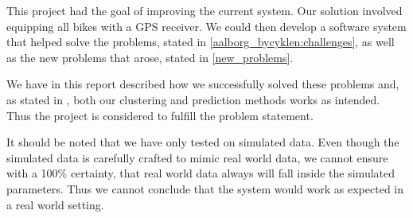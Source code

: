 This project had the goal of improving the current \citybike system.
Our solution involved equipping all bikes with a GPS receiver. We could then develop a software system that helped solve the problems, stated in \ref{aalborg_bycyklen:challenges}, as well as the new problems that arose, stated in \ref{new_problems}.

We have in this report described how we successfully solved these problems and, as stated in , both our clustering and prediction methods works as intended.
Thus the project is considered to fulfill the problem statement.

It should be noted that we have only tested on simulated data.
Even though the simulated data is carefully crafted to mimic real world data, we cannot ensure with a 100\% certainty, that real world data always will fall inside the simulated parameters. Thus we cannot conclude that the system would work as expected in a real world setting.